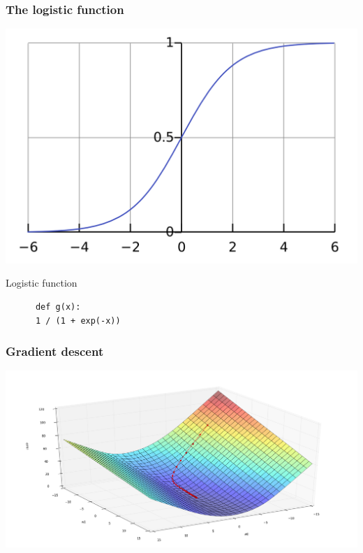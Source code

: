 \begin{frame}
  \frametitle{The logistic function}
  \begin{center}
    \includegraphics[scale=0.14]{./pictures/sigmoid.png}
  \end{center}
\end{frame}

\begin{frame}[fragile]
  \begin{block}{Logistic function}
    \begin{lstlisting}
      def g(x):
      1 / (1 + exp(-x))
    \end{lstlisting}
  \end{block}
\end{frame}

\begin{frame}
  \frametitle{Gradient descent}
  \begin{center}
    \includegraphics[scale=0.22]{./pictures/gradient_descent.png}
  \end{center}
\end{frame}
